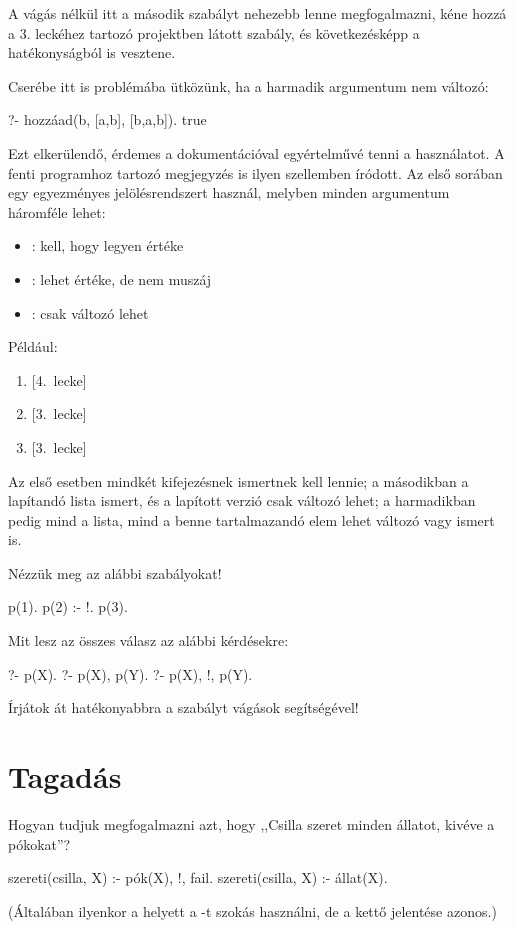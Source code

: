 A vágás nélkül itt a második szabályt nehezebb lenne
megfogalmazni, kéne hozzá a 3. leckéhez tartozó
projektben látott  szabály, és
következésképp a hatékonyságból is vesztene.

Cserébe itt is problémába ütközünk, ha a harmadik
argumentum nem változó:
\begin{query}
?- hozzáad(b, [a,b], [b,a,b]).
true
\end{query}
Ezt elkerülendő, érdemes a dokumentációval
egyértelművé tenni a használatot. A fenti programhoz
tartozó megjegyzés is ilyen szellemben íródott. Az
első sorában egy egyezményes jelölésrendszert
használ, melyben minden argumentum háromféle lehet:
\begin{itemize}
\item {} : kell, hogy legyen értéke
\item {} : lehet értéke, de nem muszáj
\item {} : csak változó lehet
\end{itemize}
Például:
\begin{enumerate}
\item {} [4.~lecke]
\item {} [3.~lecke]
\item {} [3.~lecke]
\end{enumerate}
Az első esetben mindkét kifejezésnek ismertnek kell
lennie; a másodikban a lapítandó lista ismert, és a
lapított verzió csak változó lehet; a harmadikban
pedig mind a lista, mind a benne tartalmazandó elem
lehet változó vagy ismert is.

\begin{problem}
Nézzük meg az alábbi szabályokat!
\begin{program}
p(1).
p(2) :- !.
p(3).
\end{program}       
Mit lesz az összes válasz az alábbi kérdésekre:
\begin{query}
?- p(X).
?- p(X), p(Y).
?- p(X), !, p(Y).
\end{query}
\end{problem}
\begin{problem}
Írjátok át hatékonyabbra a  szabályt
vágások segítségével!
\end{problem}

\section{Tagadás}
Hogyan tudjuk megfogalmazni azt, hogy ,,Csilla
szeret minden állatot, kivéve a pókokat''?
\begin{program}
szereti(csilla, X) :- pók(X), !, fail.
szereti(csilla, X) :- állat(X).
\end{program}
(Általában ilyenkor a  helyett a
-t szokás használni, de a kettő jelentése
azonos.)

